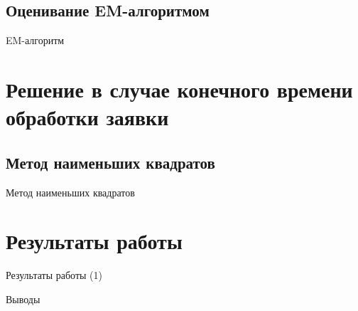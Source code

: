 \documentclass[utf8]{beamer}
\begin{document}
\begin{frame}

\end{frame}


\subsection[EM-алгоритм]{Оценивание EM-алгоритмом}
\begin{frame}{EM-алгоритм}
\end{frame}

\section[$\lambda_c \gg 0$]{Решение в случае конечного времени обработки заявки}
\subsection[МНК]{Метод наименьших квадратов}
\begin{frame}{Метод наименьших квадратов}
\end{frame}

\section{Результаты работы}
\begin{frame}{Результаты работы (1)}
\end{frame}

\begin{frame}{Выводы}
\end{frame}

\end{document}
